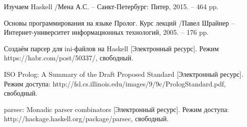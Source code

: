 
\begin{thebibliography}{9}
	 
	  Изучаем Haskell /Мена А.С. -- Санкт-Петербург: Питер, 2015. -- 464 pp.
	 
	  Основы программирования на языке Пролог. Курс лекций /Павел Шрайнер -- Интернет-университет информационных технологий, 2005. -- 176 pp.
	 
	  Создаём парсер для ini-файлов на Haskell
	  [Электронный ресурс]. Режим https://habr.com/post/50337/, свободный.
	 
	  ISO Prolog: A Summary of the Draft Proposed Standard [Электронный ресурс]. Режим доступа: http://fsl.cs.illinois.edu/images/9/9c/PrologStandard.pdf, свободный.
	 
	  parsec: Monadic parser combinators [Электронный ресурс]. Режим доступа: http://hackage.haskell.org/package/parsec, свободный.
	 
	 
\end{thebibliography}